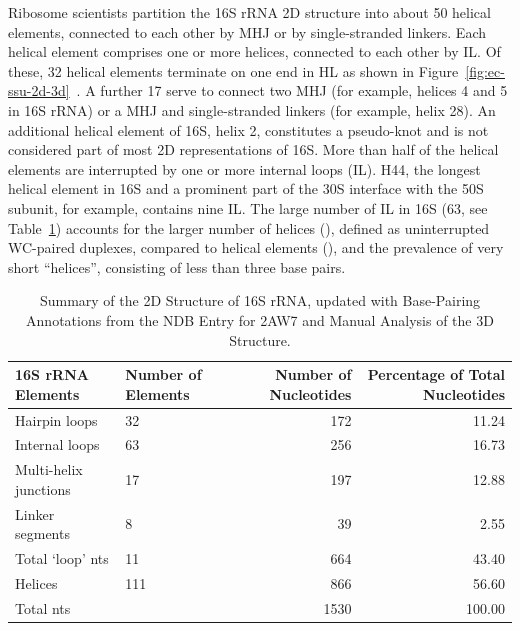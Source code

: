 Ribosome scientists partition the 16S rRNA 2D structure into about 50 helical
elements, connected to each other by MHJ or by single-stranded linkers. Each
helical element comprises one or more helices, connected to each other by IL\@. Of
these, 32 helical elements terminate on one end in HL as shown in
Figure~\ref{fig:ec-ssu-2d-3d}~\cite{Petrov2013a,Yusupov2001}. A further 17 serve to
connect two MHJ (for example, helices 4 and 5 in 16S rRNA) or a MHJ and
single-stranded linkers (for example, helix 28). An additional helical element
of 16S, helix 2, constitutes a pseudo-knot and is not considered part of most 2D
representations of 16S\@. More than half of the helical elements are interrupted
by one or more internal loops (IL). H44, the longest helical element in 16S and
a prominent part of the 30S interface with the 50S subunit, for example,
contains nine IL\@. The large number of IL in \EC{} 16S (63, see
Table~\ref{tab:ec-element-count}) accounts for the larger number of helices
(), defined as uninterrupted WC-paired duplexes, compared to helical
elements (), and the prevalence of very short ``helices'', consisting of
less than three base pairs. 

\begin{table}[ht]
  \begin{tabular}{llrr}
    \toprule
    16S rRNA Elements     & Number of Elements & Number of Nucleotides  & Percentage of Total Nucleotides \\
    \midrule
    Hairpin loops         & 32                 & 172                    & 11.24 \\
    Internal loops        & 63                 & 256                    & 16.73 \\
    Multi-helix junctions & 17                 & 197                    & 12.88 \\
    Linker segments       & 8                  & 39                     & 2.55 \\
    Total ‘loop’ nts      & 11                 & 664                    & 43.40 \\
    Helices               & 111                & 866                    & 56.60 \\
    Total nts             &                    & 1530                   & 100.00 \\
    \bottomrule
  \end{tabular}
  \caption{Summary of the 2D Structure of \EC{} 16S rRNA,
    updated with Base-Pairing Annotations from the NDB Entry for 2AW7 and Manual
  Analysis of the 3D Structure.}
\label{tab:ec-element-count}
\end{table}

